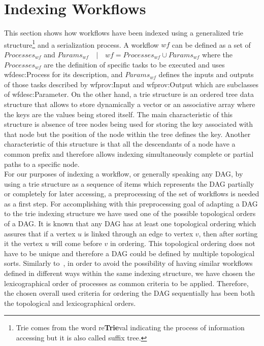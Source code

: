 \section{Indexing Workflows}
\label{sec:indexation}

This section shows how workflows have been indexed using a generalized trie structure\footnote{Trie comes from the word re{\bf Trie}val indicating the process of information accessing but it is also called suffix tree.} and a serialization process. 
A workflow $wf$ can be defined as a set of $Processes_{wf}$ and $Params_{wf} \quad | \quad wf = Processes_{wf} \cup Params_{wf}$ where the $Processes_{wf}$ are the definition of specific tasks to be executed and uses wfdesc:Process for its description, and $Params_{wf}$ defines the inputs and outputs of those tasks described by wfprov:Input and wfprov:Output which are subclasses of wfdesc:Parameter. On the other hand, a trie structure is an ordered tree data structure that allows to store dynamically a vector or an associative array where the keys are the values being stored itself. The main characteristic of this structure is absence of tree nodes being used for storing the key associated with that node but the position of the node within the tree defines the key. Another characteristic of this structure is that all the descendants of a node have a common prefix and therefore allows indexing simultaneously complete or partial paths to a specific node. \\

For our purposes of indexing a workflow, or generally speaking any DAG, by using a trie structure as a sequence of items which represents the DAG partially or completely for later accessing, a preprocessing of the set of workflows is needed as a first step. For accomplishing with this preprocessing goal of adapting a DAG to the trie indexing structure we have used one of the possible topological orders of a DAG. It is known that any DAG has at least one topological ordering which assures that if a vertex $u$ is linked through an edge to vertex $v$, then after sorting it the vertex $u$ will come before $v$ in ordering. This topological ordering does not have to be unique and therefore a DAG could be defined by multiple topological sorts. Similarly to~\cite{Matono03anindexing}, in order to avoid the possibility of having similar workflows defined in  different ways within the same indexing structure, we have chosen the lexicographical order of processes as common criteria to be applied. Therefore, the chosen overall used criteria for ordering the DAG sequentially has been both the topological and lexicographical orders. \\

